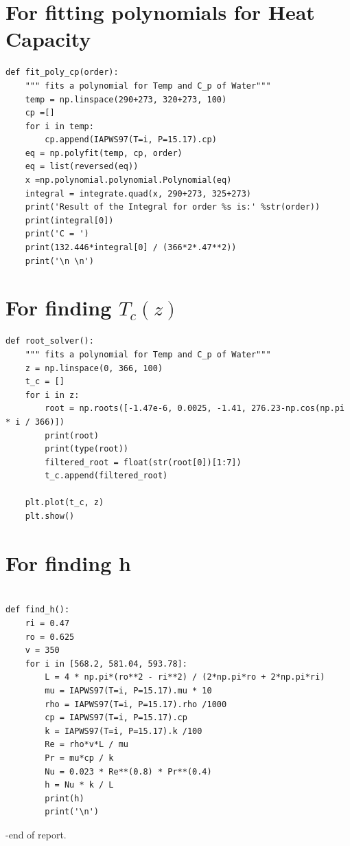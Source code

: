 \documentclass[12pt,letterpaper]{article}
\begin{document}


\pagebreak


\begin{appendices}

\section{For fitting polynomials for Heat Capacity}

\begin{verbatim}
def fit_poly_cp(order):
    """ fits a polynomial for Temp and C_p of Water"""
    temp = np.linspace(290+273, 320+273, 100)
    cp =[]
    for i in temp:
        cp.append(IAPWS97(T=i, P=15.17).cp)
    eq = np.polyfit(temp, cp, order)
    eq = list(reversed(eq))
    x =np.polynomial.polynomial.Polynomial(eq)
    integral = integrate.quad(x, 290+273, 325+273)
    print('Result of the Integral for order %s is:' %str(order))
    print(integral[0])
    print('C = ')
    print(132.446*integral[0] / (366*2*.47**2))
    print('\n \n')
\end{verbatim}

\section{For finding $T_c(z)$}

\begin{verbatim}
def root_solver():
    """ fits a polynomial for Temp and C_p of Water"""
    z = np.linspace(0, 366, 100)
    t_c = []
    for i in z:
        root = np.roots([-1.47e-6, 0.0025, -1.41, 276.23-np.cos(np.pi * i / 366)])
        print(root)
        print(type(root))
        filtered_root = float(str(root[0])[1:7])
        t_c.append(filtered_root)

    plt.plot(t_c, z)
    plt.show()
\end{verbatim}

\section{For finding h}

\begin{verbatim}

def find_h():
    ri = 0.47
    ro = 0.625
    v = 350
    for i in [568.2, 581.04, 593.78]:
        L = 4 * np.pi*(ro**2 - ri**2) / (2*np.pi*ro + 2*np.pi*ri)
        mu = IAPWS97(T=i, P=15.17).mu * 10
        rho = IAPWS97(T=i, P=15.17).rho /1000
        cp = IAPWS97(T=i, P=15.17).cp
        k = IAPWS97(T=i, P=15.17).k /100
        Re = rho*v*L / mu
        Pr = mu*cp / k
        Nu = 0.023 * Re**(0.8) * Pr**(0.4)
        h = Nu * k / L
        print(h)
        print('\n')
\end{verbatim}


\end{appendices}
\pagebreak

-end of report.
\end{document}
